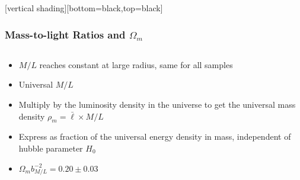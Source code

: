 \documentclass{beamer}
\begin{document}
{
    [vertical shading][bottom=black,top=black]


    \frame
    {
        \frametitle{Mass-to-light Ratios and $\Omega_m$}

        \begin{columns}
            \begin{column}{0.5\textwidth}
                \begin{itemize}
                    \item $M/L$ reaches constant at large radius, same for all samples
                    \item Universal $M/L$

                    \item Multiply by the luminosity density in the universe to
                        get the universal mass density {\color{gold} $\rho_m = \bar{\ell} \times M/L$ }


                    \item Express as fraction of the universal energy density
                        in mass, independent of hubble parameter $H_0$

                    \item {\color{gold} $\Omega_m b_{M/L}^{-2} = 0.20 \pm 0.03$ }


\end{itemize}
\end{column}
\end{columns}}}
\end{document}
